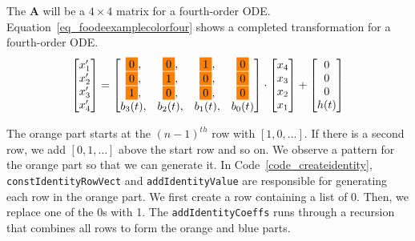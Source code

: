 The $\boldsymbol{A}$ will be a $4 \times 4$ matrix for a fourth-order ODE. Equation~\ref{eq_foodeexamplecolorfour} shows a completed transformation for a fourth-order ODE.
\begin{equation} \label{eq_foodeexamplecolorfour}
	\begin{bmatrix}
		{x_{1}'} \\
    {x_{2}'} \\
    {x_{3}'} \\
    {x_{4}'}
	\end{bmatrix}
    = 
  \begin{bmatrix}
		\highlight{orange}{0}, & \highlight{orange}{0}, & \highlight{orange}{1}, & \highlight{orange}{0} \\
    \highlight{orange}{0}, & \highlight{orange}{1}, & \highlight{orange}{0}, & \highlight{orange}{0} \\
    \highlight{orange}{1}, & \highlight{orange}{0}, & \highlight{orange}{0}, & \highlight{orange}{0} \\
    {b_{3}(t)}, & {b_{2}(t)}, & {b_{1}(t)}, & {b_{0}(t)}
	\end{bmatrix}
    \cdot
  \begin{bmatrix}
		{x_{4}} \\
    {x_{3}} \\
    {x_{2}} \\
    {x_{1}}
	\end{bmatrix}
    + 
  \begin{bmatrix}
    {0} \\
    {0} \\
    {0} \\
    {h(t)}
	\end{bmatrix}
\end{equation}

The orange part starts at the ${(n-1)}^{th}$ row with $[1, 0, \dots]$. If there is a second row, we add $[0, 1, \dots]$ above the start row and so on. We observe a pattern for the orange part so that we can generate it. In Code~\ref{code_createidentity}, \verb|constIdentityRowVect| and \verb|addIdentityValue| are responsible for generating each row in the orange part. We first create a row containing a list of 0. Then, we replace one of the 0s with 1. The \verb|addIdentityCoeffs| runs through a recursion that combines all rows to form the orange and blue parts.

